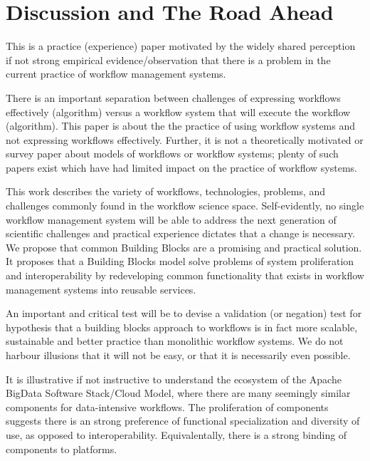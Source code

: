 \section{Discussion and The Road Ahead}\label{discussion}

This is a practice (experience) paper motivated by the widely shared
perception if not strong empirical evidence/observation  that  there is a
problem in the current practice of workflow management systems.

There is an important separation between challenges of expressing workflows
effectively (algorithm) versus a workflow system that will execute the
workflow (algorithm). This paper is about the  the practice of using workflow
systems and not expressing workflows effectively. Further, it is not a
theoretically motivated or survey paper about models of workflows or workflow
systems; plenty of such papers exist which have had limited impact on the
practice of workflow systems. 

This work describes the variety of workflows, technologies, problems, and
challenges commonly found in the workflow science space.  Self-evidently, no
single workflow management system will be able to address the next generation
of scientific challenges and practical experience dictates that a change is
necessary. We propose  that common Building Blocks are a promising and
practical solution. It proposes that a Building Blocks model solve problems of
system proliferation and interoperability by redeveloping common functionality
that exists in workflow management systems into reusable services.

An important and critical test will be to devise a validation (or negation)
test for hypothesis that a building blocks approach to workflows is in fact
more scalable, sustainable and better practice than monolithic workflow
systems. We do not harbour illusions that it will not be easy, or that it is
necessarily even possible.

It is illustrative if not instructive to understand the ecosystem of the
Apache BigData Software Stack/Cloud Model, where there are many seemingly
similar components for  data-intensive workflows. The proliferation of
components suggests there is an strong preference of functional specialization
and diversity of use, as opposed to interoperability.  Equivalentally, there
is a strong binding of components to platforms.

